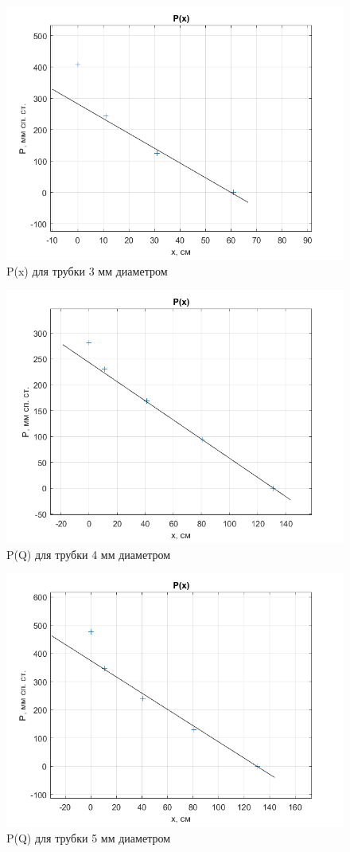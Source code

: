 \documentclass[a4paper, 12pt]{article} %
\begin{document}
\begin{figure}[!h]
    \centering
    \includegraphics[width = 9 cm]{pl3}
    \caption{P(x) для трубки 3 мм диаметром}
    \label{fig:vac}
\end{figure}


\begin{figure}[!h]
    \centering
    \includegraphics[width = 9 cm]{pl4}
    \caption{P(Q) для трубки 4 мм диаметром}
    \label{fig:vac}
\end{figure}

\begin{figure}[!h]
    \centering
    \includegraphics[width = 11 cm]{pl5}
    \caption{P(Q) для трубки 5 мм диаметром}
    \label{fig:vac}
\end{figure}
\newpage
\end{document}
